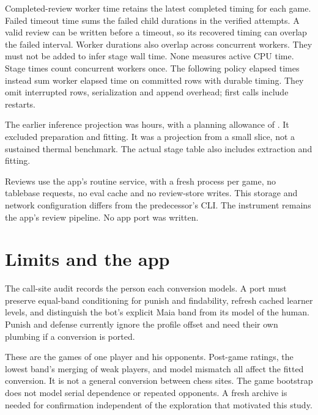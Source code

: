 \documentclass{article}
\begin{document}
\begin{center}\small\ReviewTimingTable\end{center}

Completed-review worker time retains the latest completed timing for each
game. Failed timeout time sums the failed child durations in the verified
attempts. A valid review can be written before a timeout, so its recovered
timing can overlap the failed interval. Worker durations also overlap
across concurrent workers. They must not be added to infer stage wall time.
None measures active CPU time.
Stage times count concurrent workers once. The following policy elapsed times instead
sum worker elapsed time on committed rows with durable timing. They omit interrupted rows, serialization
and append overhead; first calls include restarts.
\PolicyTimingCoverageNote{}

\begin{center}\small\PolicyTimingTable\end{center}

The earlier inference projection was \ProjectedHours{} hours, with a
planning allowance of \PlanningHours. It excluded preparation and fitting.
It was a projection from a small slice, not a sustained thermal benchmark.
The actual stage table also includes extraction and fitting.
\ProjectionPriorityNote{}

Reviews use the app's routine service, with a fresh process per game, no
tablebase requests, no eval cache and no review-store writes. This storage
and network configuration differs from the predecessor's CLI. The
instrument remains the app's review pipeline. No app port was written.

\section{Limits and the app}
\PortConclusion{}

The call-site audit records the person each conversion models. A port must
preserve equal-band conditioning for punish and findability, refresh cached
learner levels, and distinguish the bot's explicit Maia band from its model
of the human. Punish and defense currently ignore the profile offset and
need their own plumbing if a conversion is ported.

These are the games of one player and his opponents. Post-game ratings,
the lowest band's merging of weak players, and model mismatch all affect
the fitted conversion. It is not a general conversion between chess sites.
The game bootstrap does not model serial dependence or repeated opponents.
A fresh archive is needed for confirmation independent of the exploration
that motivated this study.
\end{document}
